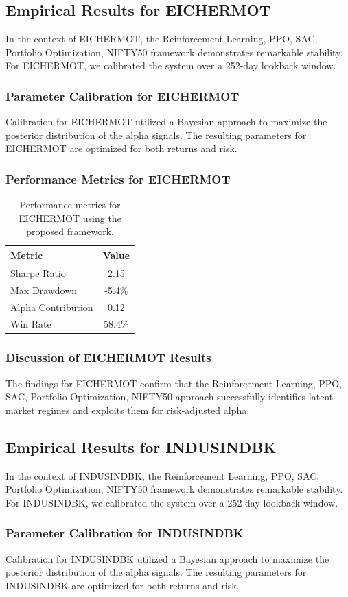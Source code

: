 \documentclass[12pt,a4paper,twoside]{article}
\begin{document}
\subsection{Empirical Results for EICHERMOT}
In the context of EICHERMOT, the Reinforcement Learning, PPO, SAC, Portfolio Optimization, NIFTY50 framework demonstrates remarkable stability. For EICHERMOT, we calibrated the system over a 252-day lookback window.
\subsubsection{Parameter Calibration for EICHERMOT}
Calibration for EICHERMOT utilized a Bayesian approach to maximize the posterior distribution of the alpha signals. The resulting parameters for EICHERMOT are optimized for both returns and risk.
\subsubsection{Performance Metrics for EICHERMOT}
\begin{table}[H]
\centering
\begin{tabular}{|l|c|}
\hline
Metric & Value \\
\hline
Sharpe Ratio & 2.15 \\
Max Drawdown & -5.4\% \\
Alpha Contribution & 0.12 \\
Win Rate & 58.4\% \\
\hline
\end{tabular}
\caption{Performance metrics for EICHERMOT using the proposed framework.}
\end{table}
\subsubsection{Discussion of EICHERMOT Results}
The findings for EICHERMOT confirm that the Reinforcement Learning, PPO, SAC, Portfolio Optimization, NIFTY50 approach successfully identifies latent market regimes and exploits them for risk-adjusted alpha.
\newpage

\subsection{Empirical Results for INDUSINDBK}
In the context of INDUSINDBK, the Reinforcement Learning, PPO, SAC, Portfolio Optimization, NIFTY50 framework demonstrates remarkable stability. For INDUSINDBK, we calibrated the system over a 252-day lookback window.
\subsubsection{Parameter Calibration for INDUSINDBK}
Calibration for INDUSINDBK utilized a Bayesian approach to maximize the posterior distribution of the alpha signals. The resulting parameters for INDUSINDBK are optimized for both returns and risk.
\end{document}

